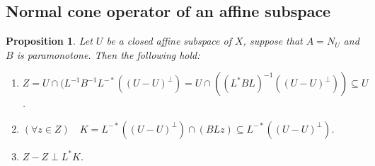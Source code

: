 \documentclass{article}
\newtheorem{proposition}[theorem]{Proposition}
\begin{document}
\subsection{Normal cone operator of an affine subspace}

\begin{proposition}
\label{p:affpara}
Let $U$ be a closed affine subspace of $X$, 
suppose that $A= N_U$ and $B$ is paramonotone. 
Then the following hold:
\begin{enumerate}
\item 
\label{p:affpara1}
$Z=U\cap (L^{-1}B^{-1}L^{-*}((U-U)^\perp)=U\cap ( (L^*BL)^{-1}((U-U)^\perp))\subseteq U$.
\item 
\label{p:affpara2}
$(\forall z\in Z)\quad K=L^{-*}((U-U)^\perp)\cap (BLz)\subseteq L^{-*}((U-U)^\perp)$.
\item 
\label{p:affpara3}
$Z-Z\perp L^*K$.
\end{enumerate}
\end{proposition}
\end{document}

